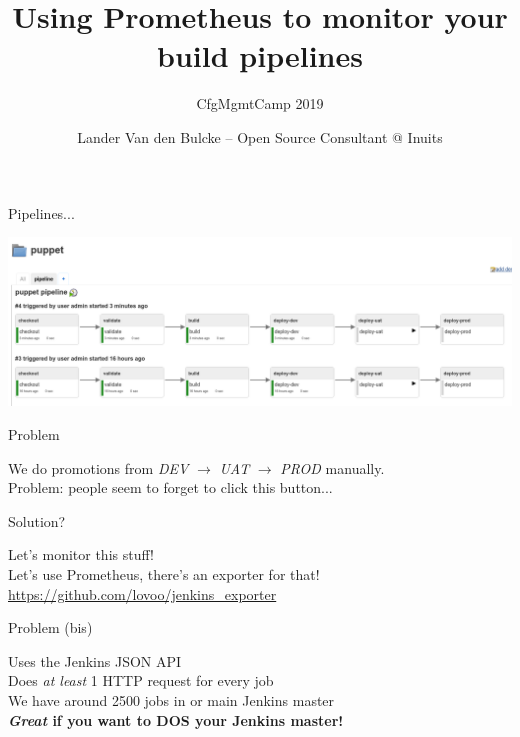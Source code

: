 \documentclass[aspectratio=169,12pt]{beamer}
\title{Using Prometheus to monitor your build pipelines}
\subtitle{CfgMgmtCamp 2019}
\author{Lander Van den Bulcke -- Open Source Consultant @ Inuits}
\date{}
\institute{landervdb @ \{twitter,github,freenode\}}
\begin{document}
\maketitle

\begin{frame}{Pipelines...}
  \begin{center}
    \includegraphics[width=\textwidth]{img/pipeline.png}
  \end{center}
\end{frame}

\begin{frame}[fragile]{Problem}
  \begin{center}
    We do promotions from \textit{DEV} $\rightarrow$ \textit{UAT} $\rightarrow$ \textit{PROD} manually. \\
    \vspace{20pt}
    Problem: people seem to forget to click this button...
  \end{center}
\end{frame}

\begin{frame}[fragile]{Solution?}
  \begin{center}
    Let's monitor this stuff! \\
    \vspace{20pt}
    Let's use Prometheus, there's an exporter for that! \\
    \vspace{20pt}
    \url{https://github.com/lovoo/jenkins_exporter}
  \end{center}
\end{frame}

\begin{frame}[fragile]{Problem (bis)}
  \begin{center}
    Uses the Jenkins JSON API \\
    \vspace{20pt}
    Does \textit{at least} 1 HTTP request for every job \\
    \vspace{20pt}
    We have around 2500 jobs in or main Jenkins master \\
    \vspace{20pt}
    \textbf{\textit{Great} if you want to DOS your Jenkins master!}
  \end{center}
\end{frame}
\end{document}

